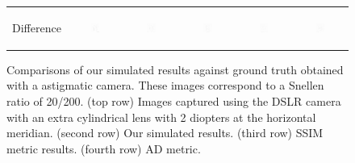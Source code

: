 \begin{figure}[!t]
\begin{tabular}{@{}r@{ } c@{ } c@{ } c@{ } c@{ } c }
	\begin{sideways} \parbox[b]{20mm} {Difference} \end{sideways} &
	\includegraphics[width=0.185\textwidth]{__Images/05/BW_20-200_+2@180/bw_N_20-200_Camera+2,00D@180(diff).png} &
	\includegraphics[width=0.185\textwidth]{__Images/05/BW_20-200_+2@180/bw_C_20-200_Camera+2,00D@180(diff).png} &
	\includegraphics[width=0.185\textwidth]{__Images/05/BW_20-200_+2@180/bw_K_20-200_Camera+2,00D@180(diff).png} &
	\includegraphics[width=0.185\textwidth]{__Images/05/BW_20-200_+2@180/bw_Z_20-200_Camera+2,00D@180(diff).png} &
	\includegraphics[width=0.185\textwidth]{__Images/05/BW_20-200_+2@180/bw_O_20-200_Camera+2,00D@180(diff).png} \\

	\end{tabular}
	
		\caption[Comparisons of our simulated results against ground truth obtained with a astigmatic camera]{Comparisons of our simulated results against ground truth obtained with a astigmatic camera. These images correspond to a Snellen ratio of 20/200. (top row) Images captured using the DSLR camera with an extra cylindrical lens with 2 diopters at the horizontal meridian. (second row) Our simulated results. (third row) SSIM metric results. (fourth row) AD metric.}

	\label{fig:comparison_astig+2@180_bw}
\end{figure}

